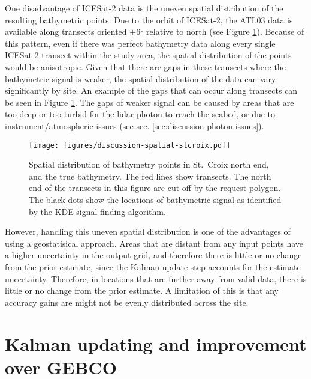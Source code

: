 One disadvantage of ICESat-2 data is the uneven spatial distribution of the resulting bathymetric points. Due to the orbit of ICESat-2, the ATL03 data is available along transects oriented $\pm \ang{6}$ relative to north (see Figure \ref{fig:distribution-of-bathy-points-in-space}). Because of this pattern, even if there was perfect bathymetry data along every single ICESat-2 transect within the study area, the spatial distribution of the points would be anisotropic. Given that there are gaps in these transects where the bathymetric signal is weaker, the spatial distribution of the data can vary significantly by site. An example of the gaps that can occur along transects can be seen in Figure \ref{fig:distribution-of-bathy-points-in-space}. The gaps of weaker signal can be caused by areas that are too deep or too turbid for the lidar photon to reach the seabed, or due to instrument/atmospheric issues (see sec. \ref{sec:discussion-photon-issues}). 


\begin{figure}
    \centering
    \texttt{[image: figures/discussion-spatial-stcroix.pdf]}
    \caption[Spatial distribution of bathymetry points in St. Croix north end]{Spatial distribution of bathymetry points in St.~Croix north end, and the true bathymetry. The red lines show transects. The north end of the transects in this figure are cut off by the request polygon. The black dots show the locations of bathymetric signal as identified by the KDE signal finding algorithm.}
    \label{fig:distribution-of-bathy-points-in-space}
\end{figure}

However, handling this uneven spatial distribution is one of the advantages of using a geostatisical approach. Areas that are distant from any input points have a higher uncertainty in the output grid, and therefore there is little or no change from the prior estimate, since the Kalman update step accounts for the estimate uncertainty. Therefore, in locations that are further away from valid data, there is little or no change from the prior estimate. A limitation of this is that any accuracy gains are might not be evenly distributed across the site. 

\section{Kalman updating and improvement over GEBCO}

